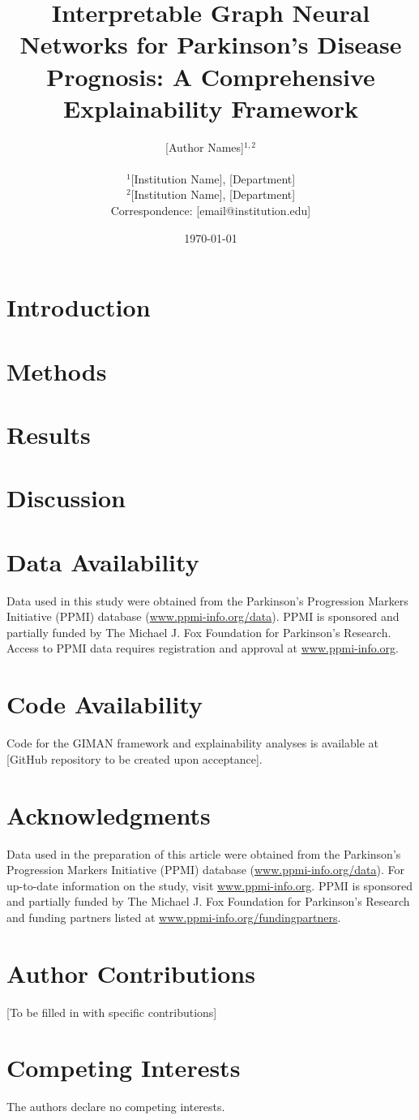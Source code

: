 \documentclass[9pt,twocolumn,twoside]{article}
\title{\textbf{Interpretable Graph Neural Networks for Parkinson's Disease Prognosis: A Comprehensive Explainability Framework}}
\author{
[Author Names]$^{1,2}$ \\
\\
\small $^1$[Institution Name], [Department] \\
\small $^2$[Institution Name], [Department] \\
\small Correspondence: [email@institution.edu]
}
\date{\today}
\newcommand{\giman}{GIMAN}
\begin{document}
\maketitle



\section{Introduction}


\section{Methods}


\section{Results}


\section{Discussion}


\section{Data Availability}
Data used in this study were obtained from the Parkinson's Progression Markers Initiative (PPMI) database (\url{www.ppmi-info.org/data}). PPMI is sponsored and partially funded by The Michael J. Fox Foundation for Parkinson's Research. Access to PPMI data requires registration and approval at \url{www.ppmi-info.org}.

\section{Code Availability}
Code for the \giman{} framework and explainability analyses is available at [GitHub repository to be created upon acceptance].

\section{Acknowledgments}
Data used in the preparation of this article were obtained from the Parkinson's Progression Markers Initiative (PPMI) database (\url{www.ppmi-info.org/data}). For up-to-date information on the study, visit \url{www.ppmi-info.org}. PPMI is sponsored and partially funded by The Michael J. Fox Foundation for Parkinson's Research and funding partners listed at \url{www.ppmi-info.org/fundingpartners}.

\section{Author Contributions}
[To be filled in with specific contributions]

\section{Competing Interests}
The authors declare no competing interests.



\end{document}
